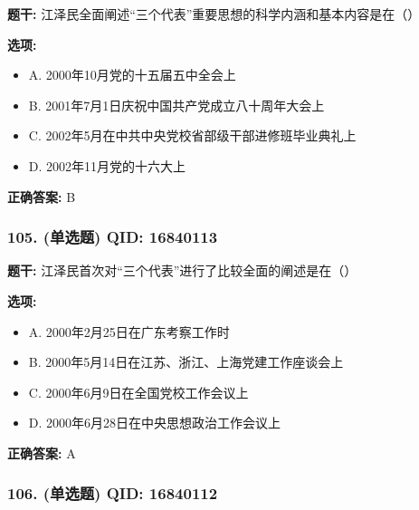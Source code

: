 \documentclass[12pt,UTF8]{ctexart}
\begin{document}
\textbf{题干:}
江泽民全面阐述“三个代表”重要思想的科学内涵和基本内容是在（）

\textbf{选项:}
\begin{itemize}[leftmargin=*]

  \item A. 2000年10月党的十五届五中全会上

  \item B. 2001年7月1日庆祝中国共产党成立八十周年大会上

  \item C. 2002年5月在中共中央党校省部级干部进修班毕业典礼上

  \item D. 2002年11月党的十六大上

\end{itemize}

\textbf{正确答案:}
B

\vspace{0.3em}\hrulefill\vspace{0.7em}

\subsubsection*{105. (单选题) \small QID: 16840113}

\textbf{题干:}
江泽民首次对“三个代表”进行了比较全面的阐述是在（）

\textbf{选项:}
\begin{itemize}[leftmargin=*]

  \item A. 2000年2月25日在广东考察工作时

  \item B. 2000年5月14日在江苏、浙江、上海党建工作座谈会上

  \item C. 2000年6月9日在全国党校工作会议上

  \item D. 2000年6月28日在中央思想政治工作会议上

\end{itemize}

\textbf{正确答案:}
A

\vspace{0.3em}\hrulefill\vspace{0.7em}

\subsubsection*{106. (单选题) \small QID: 16840112}
\end{document}
